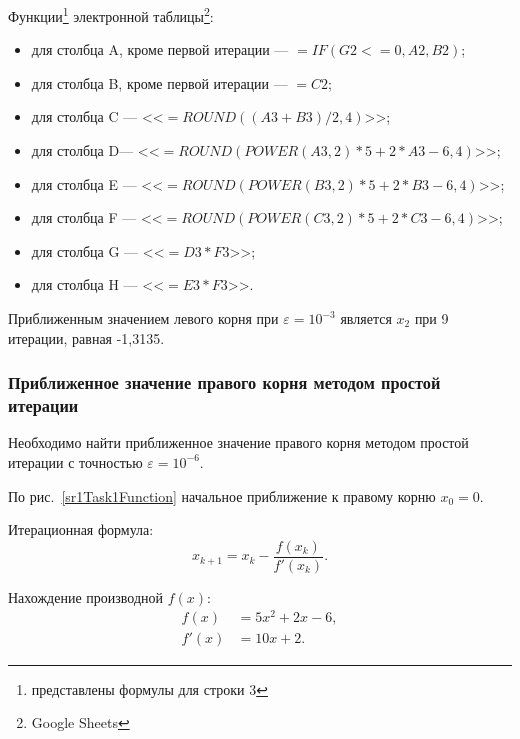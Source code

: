 \documentclass[10pt, a4paper, titlepage]{article}
\begin{document}
Функции\footnote{представлены формулы для строки 3} электронной таблицы\footnote{Google Sheets}:
\begin{itemize}
    \item для столбца A, кроме первой итерации --- $=IF(G2<=0, A2, B2)$;
    
    \item для столбца B, кроме первой итерации --- $=C2$;
    
    \item для столбца C --- <<$=ROUND((A3+B3)/2, 4)$>>;
    
    \item для столбца D--- <<$=ROUND(POWER(A3, 2)*5+2*A3-6, 4)$>>;
    
    \item для столбца E --- <<$=ROUND(POWER(B3, 2)*5+2*B3-6, 4)$>>;
    
    \item для столбца F --- <<$=ROUND(POWER(C3, 2)*5+2*C3-6, 4)$>>;
    
    \item для столбца G --- <<$=D3*F3$>>;
    
    \item для столбца H --- <<$=E3*F3$>>.

\end{itemize}

Приближенным значением левого корня при $\varepsilon=10^{-3}$ является $x_2$ при 9 итерации, равная -1,3135.

\subsubsection*{Приближенное значение правого корня методом простой итерации}

Необходимо найти приближенное значение правого корня методом простой итерации с точностью $\varepsilon=10^{-6}$.

По рис.~\ref{sr1Task1Function} начальное приближение к правому корню $x_0=0$.

Итерационная формула: $$x_{k+1}=x_k-\frac{f(x_k)}{f'(x_k)} .$$

Нахождение производной $f(x)$:
\begin{align*}
    f(x) &= 5x^2+2x-6, \\
    f'(x) &= 10x+2.
\end{align*}
\end{document}
